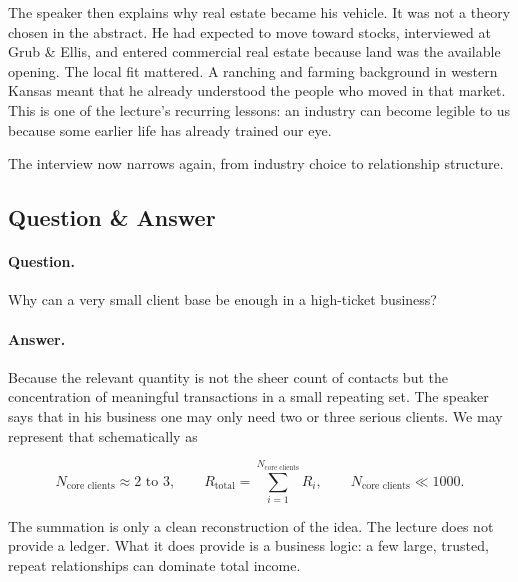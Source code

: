 The speaker then explains why real estate became his vehicle. It was not a theory chosen in the abstract. He had expected to move toward stocks, interviewed at Grub \& Ellis, and entered commercial real estate because land was the available opening. The local fit mattered. A ranching and farming background in western Kansas meant that he already understood the people who moved in that market. This is one of the lecture's recurring lessons: an industry can become legible to us because some earlier life has already trained our eye.

The interview now narrows again, from industry choice to relationship structure.

\subsection{Question \& Answer}

\paragraph{Question.} Why can a very small client base be enough in a high-ticket business?

\paragraph{Answer.} Because the relevant quantity is not the sheer count of contacts but the concentration of meaningful transactions in a small repeating set. The speaker says that in his business one may only need two or three serious clients. We may represent that schematically as

\begin{equation}
N_{\text{core clients}}\approx 2\text{ to }3,
\qquad
R_{\text{total}}=\sum_{i=1}^{N_{\text{core clients}}}R_i,
\qquad
N_{\text{core clients}}\ll 1000.
\end{equation}

The summation is only a clean reconstruction of the idea. The lecture does not provide a ledger. What it does provide is a business logic: a few large, trusted, repeat relationships can dominate total income.

\begin{figure}
\centering
{}
\end{figure}

